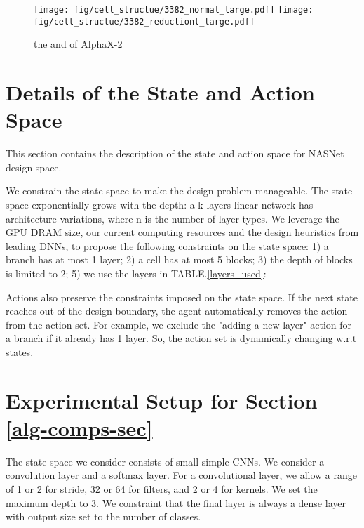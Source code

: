 \documentclass[10pt,twocolumn,letterpaper]{article}
\begin{document}
\label{ap:arch}

\begin{figure}
  \begin{center}
    \texttt{[image: fig/cell\_structue/3382\_normal\_large.pdf]}
    \texttt{[image: fig/cell\_structue/3382\_reductionl\_large.pdf]}
  \end{center}
  \caption{the  and  of AlphaX-2}
  \label{ap:3382}
\end{figure}


\section{Details of the State and Action Space}
\label{ap:state_space}

This section contains the description of the state and action space for NASNet design space.

We constrain the state space to make the design problem manageable. The state space exponentially grows with the depth: a k layers linear network has  architecture variations, where n is the number of layer types. We leverage the GPU DRAM size, our current computing resources and the design heuristics from leading DNNs, to propose the following constraints on the state space: 1) a branch has at most 1 layer; 2) a cell has at most 5 blocks; 3) the depth of blocks is limited to 2; 5) we use the layers in TABLE.\ref{layers_used}:





Actions also preserve the constraints imposed on the state space. If the next state reaches out of the design boundary, the agent automatically removes the action
from the action set. For example, we exclude the "adding a new layer" action for a branch if it already has 1 layer. So, the action set is dynamically changing w.r.t states.













\section{Experimental Setup for Section \ref{alg-comps-sec}}
\label{ap:comparison}

The state space we consider consists of small simple CNNs.
We consider a convolution layer and a softmax layer.
For a convolutional layer, we allow a range of 1 or 2 for stride, 32 or 64 for filters, and 2 or 4 for kernels.
We set the maximum depth to 3.
We constraint that the final layer is always a dense layer with output size set to the number of classes.
\end{document}

